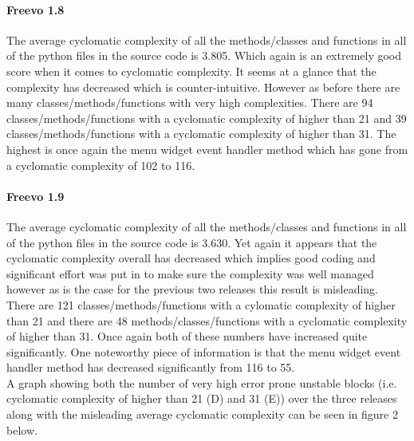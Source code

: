 \documentclass[10.5pt,journal, a4paper]{IEEEtran}
\begin{document}
\paragraph{Freevo 1.8}
\noindent
The average cyclomatic complexity of all the methods/classes and functions in all of the python files in the source code is 3.805. Which again is an extremely good score when it comes to cyclomatic complexity. It seems at a glance that the complexity has decreased which is counter-intuitive. However as before there are many classes/methods/functions with very high complexities. There are 94 classes/methods/functions with a cyclomatic complexity of higher than 21 and 39 classes/methods/functions with a cyclomatic complexity of higher than 31. The highest is once again the menu widget event handler method which has gone from a cyclomatic complexity of 102 to 116. 

\paragraph{Freevo 1.9}
\noindent
The average cyclomatic complexity of all the methods/classes and functions in all of the python files in the source code is 3.630. Yet again it appears that the cyclomatic complexity overall has decreased which implies good coding and significant effort was put in to make sure the complexity was well managed however as is the case for the previous two releases this result is misleading. There are 121 classes/methods/functions with a cylomatic complexity of higher than 21 and there are 48 methods/classes/functions with a cyclomatic complexity of higher than 31. Once again both of these numbers have increased quite significantly. One noteworthy piece of information is that the menu widget event handler method has decreased significantly from 116 to 55. \\

\noindent
A graph showing  both the number of very high error prone unstable blocks (i.e. cyclomatic complexity of higher than 21 (D) and 31 (E)) over the three releases along with the misleading average cyclomatic complexity can be seen in figure 2 below.
\end{document}
